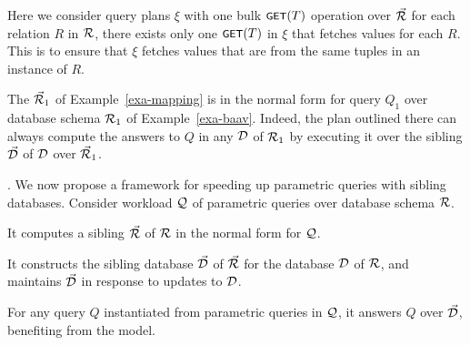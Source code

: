\vspace{0.6ex}

Here we consider query plans $\xi$ with one bulk $\text{\footnotesize \protect\ensuremath{\mathsf{GET}}}(T)$
operation
over $\vec{{\mathcal R}}$ for each relation $R$ in ${\mathcal R}$, \ie there
exists only one $\text{\footnotesize \protect\ensuremath{\mathsf{GET}}}(T)$ %
in $\xi$ that fetches values
for each $R$. This is to ensure that $\xi$ fetches values that
are from the same tuples in an instance of $R$.


\begin{example}\label{exa-norm}
The \bds $\vec{{\mathcal R}}_{1}$ of Example~\ref{exa-mapping} is in the normal
form for query $Q_{1}$ over database schema
${\mathcal R}_{1}$ of Example~\ref{exa-baav}. Indeed,
the plan outlined %
there %
can always compute the answers
to $Q$ in any  %
$\mathcal D$ of ${\mathcal R}_{1}$ by executing it over the
sibling $\vec{\mathcal D}$ of $\mathcal D$ over \bds $\vec{{\mathcal R}}_{1}$.
\end{example}

\vspace{-0.7ex}







. We now propose a framework for speeding up
parametric queries with sibling \baav databases. Consider
workload $\mathcal Q$ of parametric queries over database schema ${\mathcal R}$.
\mbi
\item[(1)] It computes a sibling \bds $\vec{{\mathcal R}}$ of ${\mathcal R}$ in the
normal form for $\mathcal Q$.
\item[(2)] It constructs the sibling \baav database $\vec{\mathcal D}$ of
$\vec{{\mathcal R}}$ for the database $\mathcal D$ of ${\mathcal R}$, and maintains $\vec{\mathcal D}$ in
response to updates to $\mathcal D$.
\item[(3)] For any query $Q$ instantiated from parametric queries
in $\mathcal Q$, it answers $Q$ over $\vec{\mathcal D}$, benefiting from the \baav
model.
\mei

